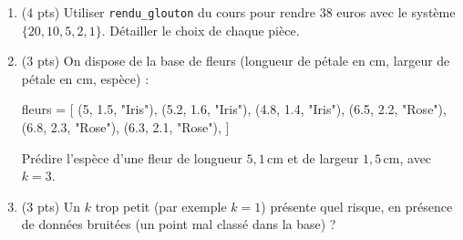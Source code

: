 \begin{enumerate}
  \item (4 pts) Utiliser \lstinline{rendu_glouton} du cours pour rendre $38$ euros avec le système $\{20, 10, 5, 2, 1\}$. Détailler le choix de chaque pièce.
  \item (3 pts) On dispose de la base de fleurs (longueur de pétale en cm, largeur de pétale en cm, espèce) :
\begin{python}
fleurs = [
    (5, 1.5, "Iris"), (5.2, 1.6, "Iris"), (4.8, 1.4, "Iris"),
    (6.5, 2.2, "Rose"), (6.8, 2.3, "Rose"), (6.3, 2.1, "Rose"),
]
\end{python}
  Prédire l'espèce d'une fleur de longueur $5{,}1$\,cm et de largeur $1{,}5$\,cm, avec $k=3$.
  \item (3 pts) Un $k$ trop petit (par exemple $k=1$) présente quel risque, en présence de données bruitées (un point mal classé dans la base) ?
\end{enumerate}

